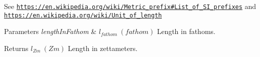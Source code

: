 See \href{https://en.wikipedia.org/wiki/Metric_prefix#List_of_SI_prefixes}{\tt https\+://en.\+wikipedia.\+org/wiki/\+Metric\+\_\+prefix\#\+List\+\_\+of\+\_\+\+S\+I\+\_\+prefixes} and \href{https://en.wikipedia.org/wiki/Unit_of_length}{\tt https\+://en.\+wikipedia.\+org/wiki/\+Unit\+\_\+of\+\_\+length} 
\begin{DoxyParams}{Parameters}
{\em length\+In\+Fathom} & $ l_{fathom}\ (fathom)$ Length in fathoms. \\
\hline
\end{DoxyParams}
\begin{DoxyReturn}{Returns}
$ l_{Zm}\ (Zm)$ Length in zettameters. 
\end{DoxyReturn}
